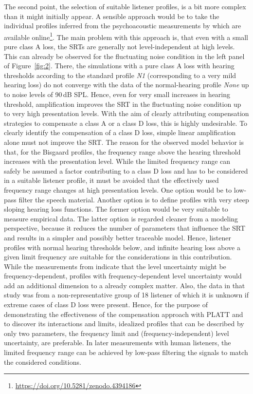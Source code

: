 \documentclass[10pt,a4paper,twocolumn]{article}
\begin{document}
The second point, the selection of suitable listener profiles, is a bit more complex than it might initially appear.
%
A sensible approach would be to take the individual profiles inferred from the psychoacoustic measurements by \cite{schaedler2020a} which are available online\footnote{\url{https://doi.org/10.5281/zenodo.4394186}}.
%
The main problem with this approach is, that even with a small pure class A loss, the SRTs are generally not level-independent at high levels.
%
This can already be observed for the fluctuating noise condition in the left panel of Figure~\ref{fig:2}.
%
There, the simulations with a pure class A loss with hearing thresholds according to the standard profile \emph{N1} (corresponding to a very mild hearing loss) do not converge with the data of the normal-hearing profile \emph{None} up to noise levels of 90\,dB SPL.
%
Hence, even for very small increases in hearing threshold, amplification improves the SRT in the fluctuating noise condition up to very high presentation levels.
%
With the aim of clearly attributing compensation strategies to compensate a class A or a class D loss, this is highly undesirable.
%
To clearly identify the compensation of a class D loss, simple linear amplification alone must not improve the SRT.
%
The reason for the observed model behavior is that, for the Bisgaard profiles, the frequency range above the hearing threshold increases with the presentation level.
%
While the limited frequency range can safely be assumed a factor contributing to a class D loss and has to be considered in a suitable listener profile, it must be avoided that the effectively used frequency range changes at high presentation levels.
%
One option would be to low-pass filter the speech material.
%
Another option is to define profiles with very steep sloping hearing loss functions.
%
The former option would be very suitable to measure empirical data.
%
The latter option is regarded cleaner from a modeling perspective, because it reduces the number of parameters that influence the SRT and results in a simpler and possibly better traceable model.
%
Hence, listener profiles with normal hearing thresholds below, and infinite hearing loss above a given limit frequency are suitable for the considerations in this contribution.
%
While the measurements from \cite{schaedler2020a} indicate that the level uncertainty might be frequency-dependent, profiles with frequency-dependent level uncertainty would add an additional dimension to a already complex matter.
%
Also, the data in that study was from a non-representative group of 18 listener of which it is unknown if extreme cases of class D loss were present.
%
Hence, for the purpose of demonstrating the effectiveness of the compensation approach with PLATT and to discover its interactions and limits, idealized profiles that can be described by only two parameters, the frequency limit and (frequency-independent) level uncertainty, are preferable.
%
In later measurements with human listeners, the limited frequency range can be achieved by low-pass filtering the signals to match the considered conditions.
\end{document}
